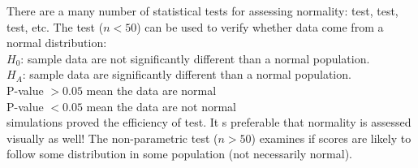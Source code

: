 

There are a many number of statistical tests for assessing normality:  test,  test,  test, etc. The  test ($n<50$) can be used to verify whether data come from a normal distribution: \\
$H_0$: sample data are not significantly different than a normal population. \\
$H_A$: sample data are significantly different than a normal population. \\
P-value $>0.05$ mean the data are normal \\
P-value $<0.05$ mean the data are not normal \\
 simulations proved the efficiency of  test. It s preferable that normality is assessed visually as well! The  non-parametric test ($n>50$) examines if scores are likely to follow some distribution in some population (not necessarily normal).